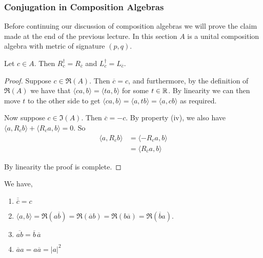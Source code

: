 \subsubsection{Conjugation in Composition Algebras}
Before continuing our discussion of composition algebras we will prove the claim made at the end of the previous lecture. In this section $A$ is a unital composition algebra with metric of signature $(p,q)$.
\begin{lemma}
    Let $c \in A$. Then $R_c^\dagger = R_{\overline{c}}$ and $L_c^\dagger = L_{\overline{c}}$.
\end{lemma}
\begin{proof}
    Suppose $c \in \Re(A)$. Then $\overline{c}=c$, and furthermore, by the definition of $\Re(A)$ we have that $\langle ca,b\rangle = \langle ta,b\rangle$ for some $t\in \operatorname{\mathbb{R}}$. By linearity we can then move $t$ to the other side to get $\langle ca,b\rangle = \langle a,tb\rangle = \langle a,cb\rangle$ as required.

    Now suppose $c\in\Im(A)$. Then $\overline{c}=-c$. By property (iv), we also have $\langle a,R_cb\rangle + \langle R_ca,b\rangle=0$. So 
    \begin{align*}\langle a,R_cb\rangle &= \langle- R_ca,b\rangle \\&= \langle R_{\overline{c}}a,b\rangle\end{align*}

    By linearity the proof is complete.
\end{proof}
\begin{lemma}
    We have,
    \begin{enumerate}
    \item {
    $\overline{\overline{c}}=c$
    }
    \item {
    $\langle a,b\rangle = \Re(a\overline{b}) = \Re(\overline{a}b) = \Re(b\overline{a})=\Re(\overline{b}a)$.
    }
    \item {
    $\overline{ab} = \overline{b}\,\overline{a}$
    }
    \item {
    $\overline{a}a=a\overline{a} = |a|^2$
    }
    \end{enumerate}
\end{lemma}

